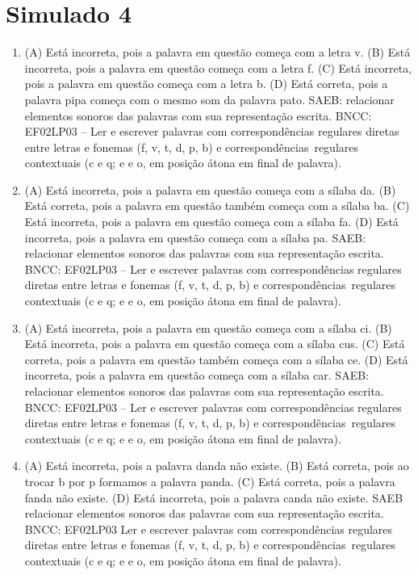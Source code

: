 \section*{Simulado 4}

\begin{enumerate}
\item
(A) Está incorreta, pois a palavra em questão começa com a letra v.
(B) Está incorreta, pois a palavra em questão começa com a letra f.
(C) Está incorreta, pois a palavra em questão começa com a letra b.
(D) Está correta, pois a palavra pipa começa com o mesmo som da palavra pato.
SAEB: relacionar elementos sonoros das palavras com sua representação
escrita.
BNCC: EF02LP03 -- Ler e escrever palavras com correspondências
regulares diretas entre letras e fonemas (f, v, t, d, p, b) e
correspondências~regulares contextuais (c e q; e e o, em posição átona
em final de palavra).

\item
(A) Está incorreta, pois a palavra em questão começa com a sílaba da.
(B) Está correta, pois a palavra em questão também começa com a sílaba ba.
(C) Está incorreta, pois a palavra em questão começa com a sílaba fa.
(D) Está incorreta, pois a palavra em questão começa com a sílaba pa.
SAEB: relacionar elementos sonoros das palavras com sua representação escrita.
BNCC: EF02LP03 -- Ler e escrever palavras com correspondências
regulares diretas entre letras e fonemas (f, v, t, d, p, b) e
correspondências~regulares contextuais (c e q; e e o, em posição átona
em final de palavra).

\item
(A) Está incorreta, pois a palavra em questão começa com a sílaba ci.
(B) Está incorreta, pois a palavra em questão começa com a sílaba cus.
(C) Está correta, pois a palavra em questão também começa com a sílaba ce.
(D) Está incorreta, pois a palavra em questão começa com a sílaba car.
SAEB: relacionar elementos sonoros das palavras com sua representação escrita.
BNCC: EF02LP03 -- Ler e escrever palavras com correspondências
regulares diretas entre letras e fonemas (f, v, t, d, p, b) e
correspondências~regulares contextuais (c e q; e e o, em posição átona
em final de palavra).

\item
(A) Está incorreta, pois a palavra danda não existe.
(B) Está correta, pois ao trocar b por p formamos a palavra panda.
(C) Está correta, pois a palavra fanda não existe.
(D) Está incorreta, pois a palavra canda não existe.
SAEB relacionar elementos sonoros das palavras com sua representação escrita.
BNCC: EF02LP03 Ler e escrever palavras com correspondências
regulares diretas entre letras e fonemas (f, v, t, d, p, b) e
correspondências~regulares contextuais (c e q; e e o, em posição átona
em final de palavra).


\end{enumerate}
